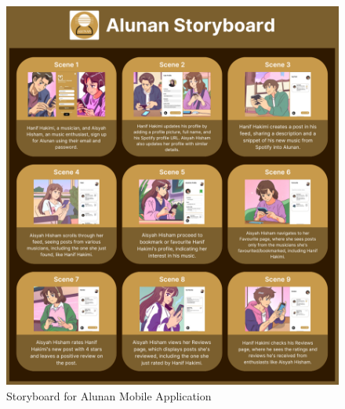 \begin{figure}[h]
    \centering
    \includegraphics[width=1.0\linewidth]{mainmatter/images/storyboard.png}
	\caption{Storyboard for Alunan Mobile Application}
    \label{fig:myfig42}
\end{figure}
\pagebreak


